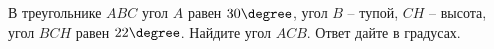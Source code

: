 \begin{ex}
	\begin{condition}
		 В треугольнике \( ABC \) угол \( A \) равен \( 30\degree\), угол \( B \) – тупой, \(CH\) – высота, угол \( BCH \) равен \( 22 \degree \). Найдите угол \( ACB \). Ответ дайте в градусах.
	\end{condition}
\end{ex}
